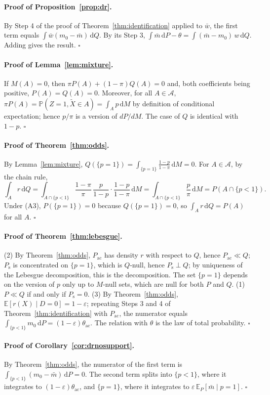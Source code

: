 \documentclass[twoside,11pt]{article}
\newcommand{\E}{\mathbb{E}}
\newcommand{\PP}{\mathbb{P}}
\newcommand{\A}{\mathcal{A}}
\newcommand{\dd}{\,\mathrm{d}}
\newcommand{\Pac}{P_{\mathrm{ac}}}
\newcommand{\Ps}{P_{\mathrm{s}}}
\newcommand{\thac}{\theta_{\mathrm{ac}}}
\theoremstyle{plain}
\theoremstyle{definition}
\begin{document}
\paragraph{Proof of Proposition~\ref{prop:dr}.}
By Step 4 of the proof of Theorem~\ref{thm:identification} applied to $\bar w$, the first term equals $\int\bar w(m_0-\bar m)\dd Q$. By its Step 3, $\int\bar m\dd P-\theta=\int(\bar m-m_0)\,w\dd Q$. Adding gives the result.
\hfill$\square$


\paragraph{Proof of Lemma~\ref{lem:mixture}.}
If $M(A)=0$, then $\pi P(A)+(1-\pi)Q(A)=0$ and, both coefficients being positive, $P(A)=Q(A)=0$. Moreover, for all $A\in\A$, $\pi P(A)=\PP(Z=1,\tilde X\in A)=\int_A p\dd M$ by definition of conditional expectation; hence $p/\pi$ is a version of $dP/dM$. The case of $Q$ is identical with $1-p$.
\hfill$\square$


\paragraph{Proof of Theorem~\ref{thm:odds}.}
By Lemma~\ref{lem:mixture}, $Q(\{p=1\})=\int_{\{p=1\}}\frac{1-p}{1-\pi}\dd M=0$. For $A\in\A$, by the chain rule,
\[
\int_A r\dd Q=\int_{A\cap\{p<1\}}\frac{1-\pi}{\pi}\,\frac{p}{1-p}\cdot\frac{1-p}{1-\pi}\dd M=\int_{A\cap\{p<1\}}\frac{p}{\pi}\dd M=P(A\cap\{p<1\}).
\]
Under (A3), $P(\{p=1\})=0$ because $Q(\{p=1\})=0$, so $\int_A r\dd Q=P(A)$ for all $A$.
\hfill$\square$


\paragraph{Proof of Theorem~\ref{thm:lebesgue}.}
(2) By Theorem~\ref{thm:odds}, $\Pac$ has density $r$ with respect to $Q$, hence $\Pac\ll Q$; $\Ps$ is concentrated on $\{p=1\}$, which is $Q$-null, hence $\Ps\perp Q$; by uniqueness of the Lebesgue decomposition, this is the decomposition. The set $\{p=1\}$ depends on the version of $p$ only up to $M$-null sets, which are null for both $P$ and $Q$. (1) $P\ll Q$ if and only if $\Ps=0$. (3) By Theorem~\ref{thm:odds}, $\E[r(X)\mid D=0]=1-\varepsilon$; repeating Steps 3 and 4 of Theorem~\ref{thm:identification} with $\Pac$, the numerator equals $\int_{\{p<1\}}m_0\dd P=(1-\varepsilon)\thac$. The relation with $\theta$ is the law of total probability.
\hfill$\square$


\paragraph{Proof of Corollary~\ref{cor:drnosupport}.}
By Theorem~\ref{thm:odds}, the numerator of the first term is $\int_{\{p<1\}}(m_0-\bar m)\dd P=0$. The second term splits into $\{p<1\}$, where it integrates to $(1-\varepsilon)\thac$, and $\{p=1\}$, where it integrates to $\varepsilon\,\E_P[\bar m\mid p=1]$.
\hfill$\square$
\end{document}
